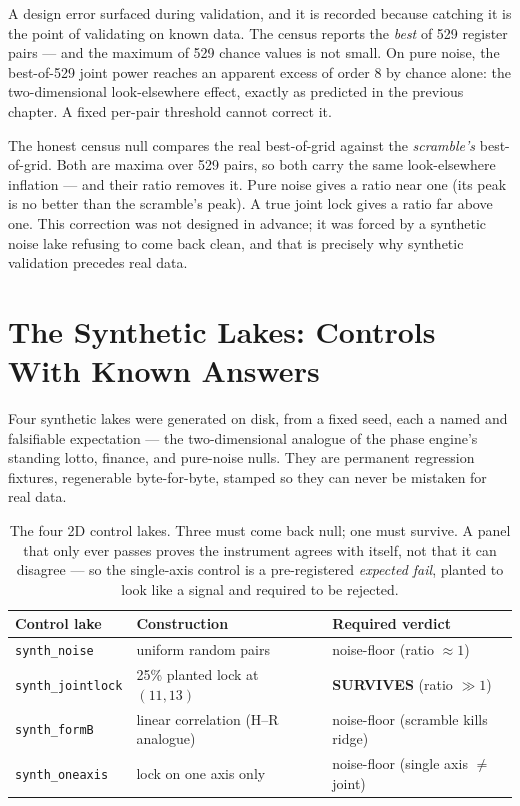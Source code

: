 \documentclass[11pt, letterpaper, openany]{book}
\begin{document}
A design error surfaced during validation, and it is recorded because catching it is the point of
validating on known data. The census reports the \emph{best} of 529 register pairs --- and the
maximum of 529 chance values is not small. On pure noise, the best-of-529 joint power reaches an
apparent excess of order 8 by chance alone: the two-dimensional look-elsewhere effect, exactly as
predicted in the previous chapter. A fixed per-pair threshold cannot correct it.

\begin{correctionbox}
The honest census null compares the real best-of-grid against the \emph{scramble's} best-of-grid.
Both are maxima over 529 pairs, so both carry the same look-elsewhere inflation --- and their ratio
removes it. Pure noise gives a ratio near one (its peak is no better than the scramble's peak). A
true joint lock gives a ratio far above one. This correction was not designed in advance; it was
forced by a synthetic noise lake refusing to come back clean, and that is precisely why synthetic
validation precedes real data.
\end{correctionbox}

\section{The Synthetic Lakes: Controls With Known Answers}

Four synthetic lakes were generated on disk, from a fixed seed, each a named and falsifiable
expectation --- the two-dimensional analogue of the phase engine's standing lotto, finance, and
pure-noise nulls. They are permanent regression fixtures, regenerable byte-for-byte, stamped so they
can never be mistaken for real data.

\begin{table}[H]
\centering
\small
\begin{tabular}{@{}lll@{}}
\toprule
\textbf{Control lake} & \textbf{Construction} & \textbf{Required verdict} \\
\midrule
\texttt{synth\_noise} & uniform random pairs & noise-floor (ratio $\approx 1$) \\
\texttt{synth\_jointlock} & 25\% planted lock at $(11,13)$ & \textbf{SURVIVES} (ratio $\gg 1$) \\
\texttt{synth\_formB} & linear correlation (H--R analogue) & noise-floor (scramble kills ridge) \\
\texttt{synth\_oneaxis} & lock on one axis only & noise-floor (single axis $\neq$ joint) \\
\bottomrule
\end{tabular}
\caption{The four 2D control lakes. Three must come back null; one must survive. A panel that only
ever passes proves the instrument agrees with itself, not that it can disagree --- so the
single-axis control is a pre-registered \emph{expected fail}, planted to look like a signal and
required to be rejected.}
\end{table}
\end{document}
